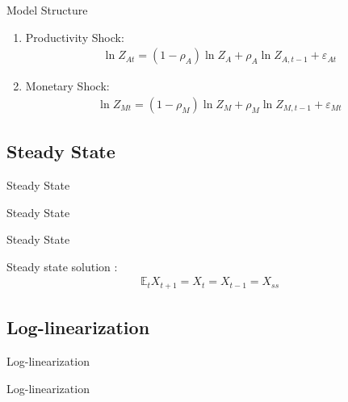 \documentclass[
presentation.tex
]{subfiles}
\begin{document}
\begin{frame}[allowframebreaks]{Model Structure}
{\begin{enumerate}
	\item Productivity Shock:
	\begin{align}
		\ln{Z_{At}} = (1-\rho_A)\ln{Z_A} + \rho_A\ln{Z_{A,t-1}} + \varepsilon_{At}
	\end{align}
	
	\item Monetary Shock:
	\begin{align}
		\ln{Z_{Mt}} = (1-\rho_M)\ln{Z_{M}} + \rho_M\ln{Z_{M,t-1}} + \varepsilon_{Mt}
	\end{align}
	
\end{enumerate}		
		
	} %
	
\end{frame}


\subsection{Steady State}

\begin{frame}{Steady State}
	
	\centering \huge Steady State
	
\end{frame}


\begin{frame}{Steady State}
	
	Steady state solution \cite[p.41]{costa_junior_understanding_2016}:
	\begin{align}
		\mathbb{E}_t X_{t+1} = X_t = X_{t-1} = X_{ss}
	\end{align}
		
\end{frame}


\subsection{Log-linearization}

\begin{frame}{Log-linearization}
	
	\centering \huge Log-linearization
		
\end{frame}
\end{document}

